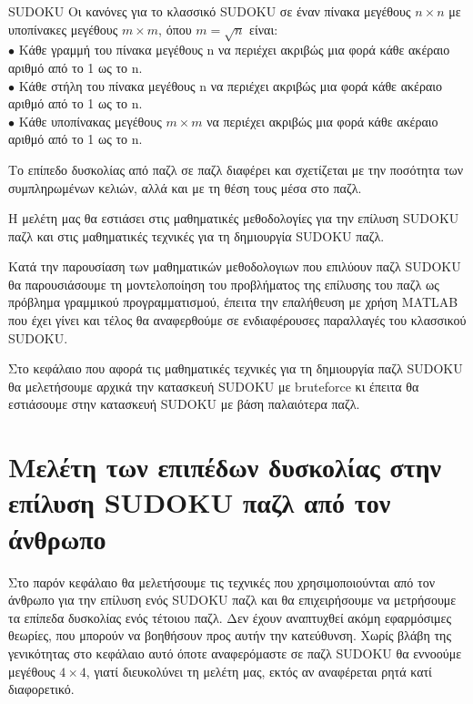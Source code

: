\documentclass[12pt]{book}
\theoremstyle{definition}
\begin{document}
\begin{mytheorem}{SUDOKU}{}
	Οι κανόνες για το κλασσικό SUDOKU σε έναν πίνακα μεγέθους \(n \times n\) με υποπίνακες μεγέθους \(m \times m\), 	όπου \(m = \sqrt{n}\) είναι: \\
	\(\bullet\) Κάθε γραμμή του πίνακα μεγέθους n να περιέχει ακριβώς μια φορά κάθε ακέραιο αριθμό από το 1 ως το n. \\
	\(\bullet\) Κάθε στήλη του πίνακα μεγέθους n να περιέχει ακριβώς μια φορά κάθε ακέραιο αριθμό από το 1 ως το n. \\
	\(\bullet\) Κάθε υποπίνακας μεγέθους \(m \times m\) να περιέχει ακριβώς μια φορά κάθε ακέραιο αριθμό από το 1 ως το n. \\
\end{mytheorem}

Το επίπεδο δυσκολίας από παζλ σε παζλ διαφέρει και σχετίζεται με την ποσότητα των συμπληρωμένων κελιών, αλλά και με τη θέση τους μέσα στο παζλ. \par

Η μελέτη μας θα εστιάσει στις μαθηματικές μεθοδολογίες για την επίλυση SUDOKU παζλ και στις μαθηματικές τεχνικές για τη δημιουργία SUDOKU παζλ. \par 

Κατά την παρουσίαση των μαθηματικών μεθοδολογιων που επιλύουν παζλ SUDOKU θα παρουσιάσουμε τη μοντελοποίηση του προβλήματος της επίλυσης του παζλ ως
πρόβλημα γραμμικού προγραμματισμού, έπειτα την επαλήθευση με χρήση MATLAB που έχει γίνει και τέλος θα αναφερθούμε σε ενδιαφέρουσες παραλλαγές του κλασσικού SUDOKU. \par

Στο κεφάλαιο που αφορά τις μαθηματικές τεχνικές για τη δημιουργία παζλ SUDOKU θα μελετήσουμε αρχικά την κατασκευή SUDOKU με bruteforce κι έπειτα θα εστιάσουμε στην κατασκευή SUDOKU με βάση παλαιότερα παζλ. \par

\chapter{Μελέτη των επιπέδων δυσκολίας στην επίλυση SUDOKU παζλ από τον άνθρωπο}

Στο παρόν κεφάλαιο θα μελετήσουμε τις τεχνικές που χρησιμοποιούνται από τον άνθρωπο για την επίλυση ενός SUDOKU παζλ και θα επιχειρήσουμε να μετρήσουμε τα επίπεδα δυσκολίας ενός τέτοιου παζλ. Δεν έχουν αναπτυχθεί ακόμη εφαρμόσιμες θεωρίες, που μπορούν να βοηθήσουν προς αυτήν την κατεύθυνση. Χωρίς βλάβη της γενικότητας στο κεφάλαιο αυτό όποτε αναφερόμαστε σε παζλ SUDOKU θα εννοούμε μεγέθους \(4 \times 4\), γιατί διευκολύνει τη μελέτη μας, εκτός αν αναφέρεται ρητά κατί διαφορετικό. \par
\end{document}
